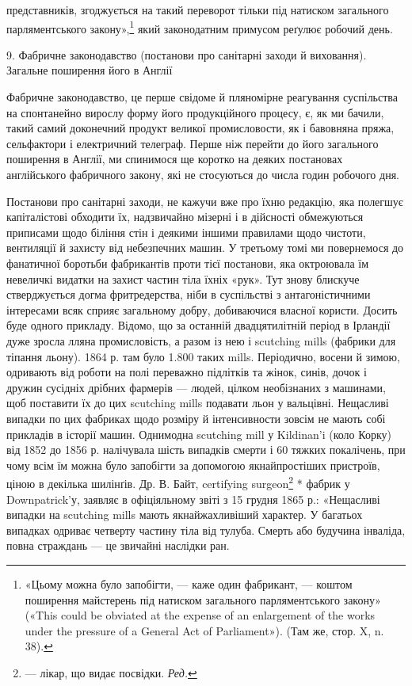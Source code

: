 \parcont{}  %
представників, згоджується на такий переворот тільки під натиском загального парляментського
закону»,\footnote{
«Цьому можна було запобігти, — каже один фабрикант, — коштом
поширення майстерень під натиском загального парляментського закону»
(«This could be obviated at the expense of an enlargement of the works
under the pressure of a General Act of Parliament»). (Там же, стор. X,
n. 38).
} який законодатним
примусом реґулює робочий день.

9. Фабричне законодавство (постанови про санітарні заходи й виховання). Загальне поширення його в
Англії

Фабричне законодавство, це перше свідоме й пляномірне реагування суспільства на спонтанейно вирослу
форму його продукційного процесу, є, як ми бачили, такий самий доконечний продукт великої
промисловости, як і бавовняна пряжа, сельфактори
і електричний телеграф. Перше ніж перейти до його загального
поширення в Англії, ми спинимося ще коротко на деяких постановах англійського фабричного закону, які
не стосуються до
числа годин робочого дня.

Постанови про санітарні заходи, не кажучи вже про їхню
редакцію, яка полегшує капіталістові обходити їх, надзвичайно
мізерні і в дійсності обмежуються приписами щодо біління стін
і деякими іншими правилами щодо чистоти, вентиляції й захисту
від небезпечних машин. У третьому томі ми повернемося до фанатичної боротьби фабрикантів проти тієї
постанови, яка октроювала їм невеличкі видатки на захист частин тіла їхніх «рук».
Тут знову блискуче стверджується догма фритредерства, ніби в
суспільстві з антагоністичними інтересами всяк сприяє загальному добру, добиваючися власної користи.
Досить буде одного
прикладу. Відомо, що за останній двадцятилітній період в Ірландії дуже зросла лляна промисловість, а
разом із нею і scutching
mills (фабрики для тіпання льону). 1864 р. там було 1.800 таких
mills. Періодично, восени й зимою, одривають від роботи на
полі переважно підлітків та жінок, синів, дочок і дружин сусідніх дрібних фармерів — людей, цілком
необізнаних з машинами,
щоб поставити їх до цих scutching mills подавати льон у вальцівні.
Нещасливі випадки по цих фабриках щодо розміру й інтенсивности зовсім не мають собі прикладів в
історії машин. Однимодна
scutching mill у Kildinan’i (коло Корку) від 1852 до 1856 р.
налічувала шість випадків смерти і 60 тяжких покалічень, при
чому всім їм можна було запобігти за допомогою якнайпростіших пристроїв, ціною в декілька шилінґів.
Др. В. Байт, certifying
surgeon\footnote*{
— лікар, що видає посвідки. \emph{Ред.}
} * фабрик у Downpatrick’у, заявляє в офіціяльному
звіті з 15 грудня 1865 р.: «Нещасливі випадки на scutching
mills мають якнайжахливіший характер. У багатьох випадках одриває четверту частину тіла від тулуба.
Смерть або будучина інваліда, повна страждань — це звичайні наслідки ран.
\parbreak{}  %
